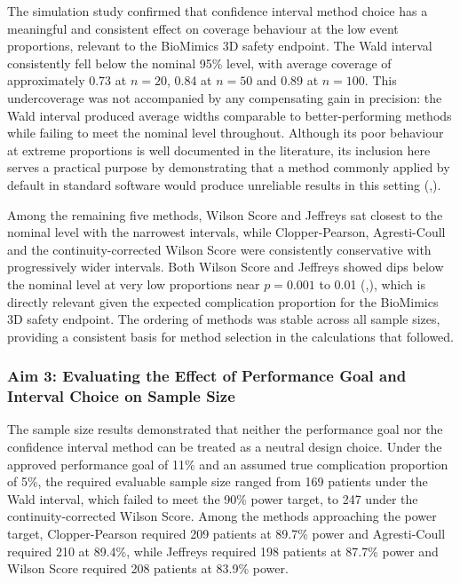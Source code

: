 \documentclass{article}
\begin{document}
The simulation study confirmed that confidence interval method choice
has a meaningful and consistent effect on coverage behaviour at the low
event proportions, relevant to the BioMimics 3D safety endpoint. The
Wald interval consistently fell below the nominal 95\% level, with
average coverage of approximately 0.73 at \(n = 20\), 0.84 at \(n = 50\)
and 0.89 at \(n = 100\). This undercoverage was not accompanied by any
compensating gain in precision: the Wald interval produced average
widths comparable to better-performing methods while failing to meet the
nominal level throughout. Although its poor behaviour at extreme
proportions is well documented in the literature, its inclusion here
serves a practical purpose by demonstrating that a method commonly
applied by default in standard software would produce unreliable results
in this setting
(,).

Among the remaining five methods, Wilson Score and Jeffreys sat closest
to the nominal level with the narrowest intervals, while
Clopper-Pearson, Agresti-Coull and the continuity-corrected Wilson Score
were consistently conservative with progressively wider intervals. Both
Wilson Score and Jeffreys showed dips below the nominal level at very
low proportions near \(p = 0.001\) to 0.01
(,),
which is directly relevant given the expected complication proportion
for the BioMimics 3D safety endpoint. The ordering of methods was stable
across all sample sizes, providing a consistent basis for method
selection in the calculations that followed.

\subsubsection{Aim 3: Evaluating the Effect of Performance Goal and
Interval Choice on Sample
Size}\label{aim-3-evaluating-the-effect-of-performance-goal-and-interval-choice-on-sample-size}

The sample size results demonstrated that neither the performance goal
nor the confidence interval method can be treated as a neutral design
choice. Under the approved performance goal of 11\% and an assumed true
complication proportion of 5\%, the required evaluable sample size
ranged from 169 patients under the Wald interval, which failed to meet
the 90\% power target, to 247 under the continuity-corrected Wilson
Score. Among the methods approaching the power target, Clopper-Pearson
required 209 patients at 89.7\% power and Agresti-Coull required 210 at
89.4\%, while Jeffreys required 198 patients at 87.7\% power and Wilson
Score required 208 patients at 83.9\% power.
\end{document}
